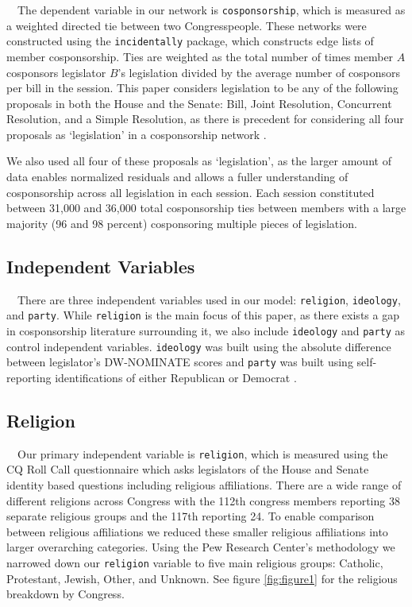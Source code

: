 \documentclass[Royal,times,sageh]{sagej}
\begin{document}
~~The dependent variable in our network is \texttt{cosponsorship}, which
is measured as a weighted directed tie between two Congresspeople. These
networks were constructed using the \texttt{incidentally} package, which
constructs edge lists of member cosponsorship. Ties are weighted as the
total number of times member \(A\) cosponsors legislator \(B\)'s
legislation divided by the average number of cosponsors per bill in the
session. This paper considers legislation to be any of the following
proposals in both the House and the Senate: Bill, Joint Resolution,
Concurrent Resolution, and a Simple Resolution, as there is precedent
for considering all four proposals as `legislation' in a cosponsorship
network \citep{neal2014}.

We also used all four of these proposals as `legislation', as the larger
amount of data enables normalized residuals and allows a fuller
understanding of cosponsorship across all legislation in each session.
Each session constituted between 31,000 and 36,000 total cosponsorship
ties between members with a large majority (96 and 98 percent)
cosponsoring multiple pieces of legislation.

\hypertarget{independent-variables}{%
\subsection{Independent Variables}\label{independent-variables}}

~~There are three independent variables used in our model:
\texttt{religion}, \texttt{ideology}, and \texttt{party}. While
\texttt{religion} is the main focus of this paper, as there exists a gap
in cosponsorship literature surrounding it, we also include
\texttt{ideology} and \texttt{party} as control independent variables.
\texttt{ideology} was built using the absolute difference between
legislator's DW-NOMINATE \citep{vote} scores and \texttt{party} was
built using self-reporting identifications of either Republican or
Democrat \citep[\citet{pew112}]{pew117}.

\hypertarget{religion}{%
\subsection{Religion}\label{religion}}

~~Our primary independent variable is \texttt{religion}, which is
measured using the CQ Roll Call questionnaire
\citep[\citet{pew112}]{pew117} which asks legislators of the House and
Senate identity based questions including religious affiliations. There
are a wide range of different religions across Congress with the 112th
congress members reporting 38 separate religious groups and the 117th
reporting 24. To enable comparison between religious affiliations we
reduced these smaller religious affiliations into larger overarching
categories. Using the Pew Research Center's \citep{pewmethod}
methodology we narrowed down our \texttt{religion} variable to five main
religious groups: Catholic, Protestant, Jewish, Other, and Unknown. See
figure \ref{fig:figure1} for the religious breakdown by Congress.
\end{document}
